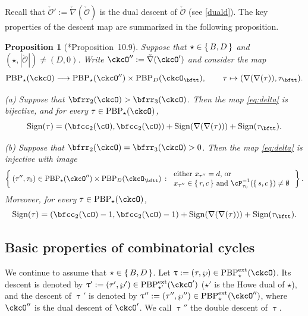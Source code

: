 \documentclass[11pt,a4paper]{amsart}
\def\abs#1{\left|{#1}\right|}
\newcommand{\CO}{{\mathcal {O}}}
\def\DD{\nabla}
\numberwithin{equation}{section}
\newtheorem{prop}[thm]{Proposition}
\theoremstyle{remark}
\def\ssign{\mathrm{Sign}}
\def\PBPes{\mathrm{PBP}^{\mathrm{ext}}_{\star}}
\def\ckcOpp{\ckcO^{\prime\prime}}
\def\ckDD{{\check\DD}}
\def\PBP{\mathrm{PBP}}
\begin{document}
Recall that $\check \CO':=\check \nabla(\check \CO)$ is the dual descent of $\check \CO$ (see \eqref{duald}).  The key properties of the descent map
are summarized in the following proposition.


\begin{prop}[{\cite{BMSZa}*{Proposition~10.9}}]
\label{lem:delta}
Suppose that $\star \in \set{B,D}$ and $(\star, \abs{\check \CO})\neq (D, 0)$. Write $\ckcOpp := \ckDD(\ckcO')$ and consider the map
\begin{equation}\label{eq:delta}
   \PBP_\star(\ckcO)\longrightarrow
    \PBP_\star(\ckcOpp)\times \PBP_{D}(\ckcO_\bftt),
    \qquad \tau \mapsto (\nabla(\nabla(\tau)),\tau_\bftt).
\end{equation}

\noindent (a) Suppose that
$\bfrr_2(\ckcO)>\bfrr_3(\ckcO)$. Then the map \eqref{eq:delta} is bijective, and for every $\tau\in  \PBP_\star(\ckcO) $,
\begin{equation}\label{eq:sign.D}
\ssign(\tau)
=(\bfcc_2(\cO),\bfcc_2(\cO))+\ssign(\nabla(\nabla(\tau)))+\ssign(\tau_\bftt).
\end{equation}

\noindent (b)  Suppose that  $\bfrr_2(\ckcO)=\bfrr_3(\ckcO)>0$.
Then the map \eqref{eq:delta} is injective with image
\begin{equation}\label{eq:delta.I}
    \Set{ (\tau'',\tau_0)  \in \PBP_\star(\ckcOpp)\times \PBP_D(\ckcO_\bftt)  \,:\,
    \begin{array}{l}
        \text{either
    $x_{\tau''} = d$, or} \\
    \text{$x_{\tau''}\in \set{r,c}$  and
    $\cP_{\tau_0}^{-1}(\set{s,c})\neq \emptyset$}
    \end{array}
}.
\end{equation}
Moreover,  for every $\tau\in  \PBP_\star(\ckcO) $,
\begin{equation}\label{eq:sign.GD}
\ssign(\tau)
=(\bfcc_2(\cO)-1,\bfcc_2(\cO)-1)+\ssign(\nabla(\nabla(\tau)))+\ssign(\tau_\bftt).
\end{equation}
\end{prop}


\subsection{Basic properties of combinatorial cycles}


We continue to assume that $\star\in \set{B,D}$.
Let $\uptau:=(\tau, \wp)\in \PBPes(\ckcO)$. Its  descent is denoted by $\uptau':=(\tau', \wp')\in \PBP_{\star'}^{\textrm{ext}}(\ckcO')$ ($\star'$ is the Howe dual of $\star$), and the descent of $\uptau'$ is denoted by $\uptau'':=(\tau'', \wp'')\in \PBPes(\ckcO'')$, where $\ckcO''$ is the dual descent of $\ckcO'$. We call $\uptau''$ the double descent of $\uptau$.
\end{document}
